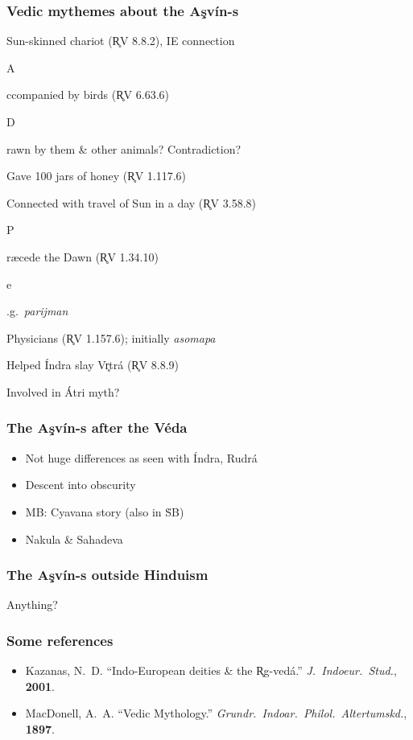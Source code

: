 \documentclass[pdf]{beamer}
\newcommand{\Subitem}[1]{{\setlength\itemindent{12pt} \item[-] #1}}
\newcommand{\Subsubitem}[1]{{\setlength\itemindent{24pt} \item[○] #1}}
\begin{document}
\begin{frame} \frametitle{Vedic mythemes about the Aşvín-s}
\begin{itemize}
	\item Sun-skinned chariot (R̥V 8.8.2), IE connection
	\Subitem Accompanied by birds (R̥V 6.63.6)
	\Subsubitem Drawn by them \& other animals? Contradiction?
	\item Gave 100 jars of honey (R̥V 1.117.6)
	\item Connected with travel of Sun in a day (R̥V 3.58.8)
	\Subitem Præcede the Dawn (R̥V 1.34.10)
	\Subitem e.g.~\textit{parijman}
	\item Physicians (R̥V 1.157.6); initially \textit{asomapa}
	\item Helped Índra slay Vr̥trá (R̥V 8.8.9)
	\item Involved in Átri myth?
\end{itemize}
\end{frame}

\begin{frame} \frametitle{The Aşvín-s after the Véda}
\begin{itemize}
	\item Not huge differences as seen with Índra, Rudrá
	\item Descent into obscurity
	\item MB: Cyavana story (also in ṠB)
	\item Nakula \& Sahadeva
\end{itemize}
\end{frame}

\begin{frame} \frametitle{The Aşvín-s outside Hinduism}
\begin{center}
	Anything?
\end{center}
\end{frame}

\begin{frame} \frametitle{Some references}
\begin{itemize}
	\item Kazanas, N.~D. ``Indo-European deities \& the R̥g-vedá.'' \textit{J.~Indoeur.~Stud.}, \textbf{2001}.
	\item MacDonell, A.~A. ``Vedic Mythology.'' \textit{Grundr.~Indoar.~Philol.~Altertumskd.}, \textbf{1897}.
\end{itemize}
\end{frame}
\end{document}
